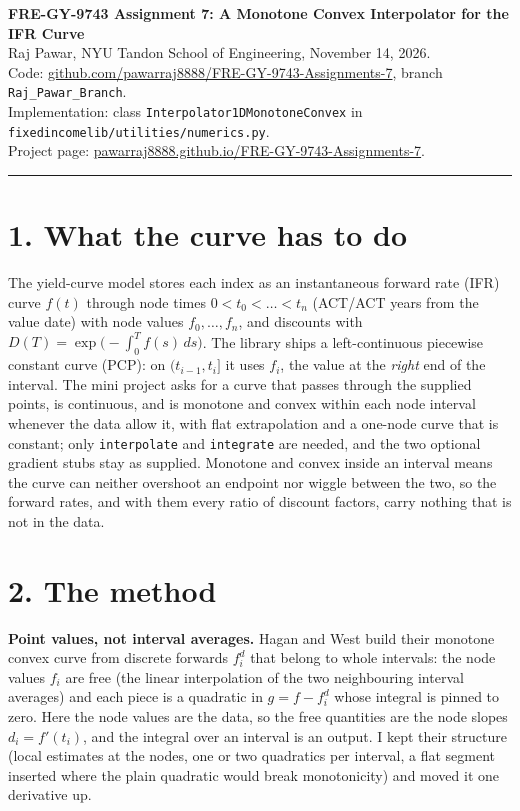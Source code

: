 \documentclass[10pt]{article}
\newcommand{\code}[1]{\texttt{#1}}
\begin{document}
{\Large\bfseries FRE-GY-9743 Assignment 7: A Monotone Convex Interpolator for the IFR Curve}\\[1pt]
Raj Pawar, NYU Tandon School of Engineering, November 14, 2026.\\
Code: \href{https://github.com/pawarraj8888/FRE-GY-9743-Assignments-7/tree/Raj_Pawar_Branch}{github.com/pawarraj8888/FRE-GY-9743-Assignments-7}, branch \code{Raj\_Pawar\_Branch}.\\
Implementation: class \code{Interpolator1DMonotoneConvex} in \code{fixedincomelib/utilities/numerics.py}.\\
Project page: \href{https://pawarraj8888.github.io/FRE-GY-9743-Assignments-7/}{pawarraj8888.github.io/FRE-GY-9743-Assignments-7}.
\vspace{2pt}\hrule

\section*{1. What the curve has to do}
The yield-curve model stores each index as an instantaneous forward rate (IFR) curve $f(t)$ through node times $0<t_0<\dots<t_n$
(ACT/ACT years from the value date) with node values $f_0,\dots,f_n$, and discounts with $D(T)=\exp\bigl(-\int_0^T f(s)\,ds\bigr)$.
The library ships a left-continuous piecewise constant curve (PCP): on $(t_{i-1},t_i]$ it uses $f_i$, the value at the \emph{right} end
of the interval. The mini project asks for a curve that passes through the supplied points, is continuous, and is monotone and convex
within each node interval whenever the data allow it, with flat extrapolation and a one-node curve that is constant; only
\code{interpolate} and \code{integrate} are needed, and the two optional gradient stubs stay as supplied. Monotone and convex inside
an interval means the curve can neither overshoot an endpoint nor wiggle between the two, so the forward rates, and with them every
ratio of discount factors, carry nothing that is not in the data.

\section*{2. The method}
\textbf{Point values, not interval averages.} Hagan and West build their monotone convex curve from discrete forwards $f^d_i$ that
belong to whole intervals: the node values $f_i$ are free (the linear interpolation of the two neighbouring interval averages) and each
piece is a quadratic in $g=f-f^d_i$ whose integral is pinned to zero. Here the node values are the data, so the free quantities are the
node slopes $d_i=f'(t_i)$, and the integral over an interval is an output. I kept their structure (local estimates at the nodes, one
or two quadratics per interval, a flat segment inserted where the plain quadratic would break monotonicity) and moved it one derivative up.
\end{document}
